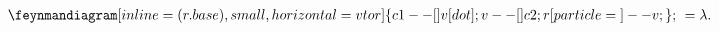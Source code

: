 \documentclass[preview]{standalone}
\begin{document}
\abovedisplayskip=0pt
\begin{align*}
    \feynmandiagram [inline=(r.base), small, horizontal=v to r] {
        c1 --[] v [dot];
        v --[] c2;
        r[particle=\vphantom{Mg}] -- v;
    }; \ &= \lambda.
\end{align*}
\end{document}

